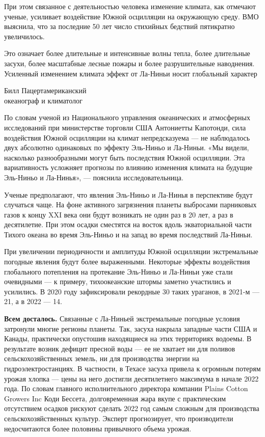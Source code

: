 При этом связанное с деятельностью человека изменение климата, как отмечают ученые, усиливает воздействие Южной осцилляции на окружающую среду. ВМО выяснила, что за последние 50 лет число стихийных бедствий пятикратно увеличилось.

\begin{fancyquotes}
    Это означает более длительные и интенсивные волны тепла, более длительные засухи, более масштабные лесные пожары и более разрушительные наводнения. Усиленный изменением климата эффект от Ла-Ниньи носит глобальный характер

    \begin{flushright}
        Билл Пацертамериканский \\
        океанограф и климатолог
    \end{flushright}
\end{fancyquotes}

По словам ученой из Национального управления океанических и атмосферных исследований при министерстве торговли США Антониетты Капотонди, сила воздействия Южной осцилляции на климат непредсказуема — не наблюдалось двух абсолютно одинаковых по эффекту Эль-Ниньо и Ла-Ниньи. «Мы видели, насколько разнообразными могут быть последствия Южной осцилляции. Эта вариативность усложняет прогнозы по влиянию изменения климата на будущие Эль-Ниньо и Ла-Нинья», — пояснила исследовательница.

Ученые предполагают, что явления Эль-Ниньо и Ла-Нинья в перспективе будут случаться чаще. На фоне активного загрязнения планеты выбросами парниковых газов к концу XXI века они будут возникать не один раз в 20 лет, а раз в десятилетие. При этом осадки сместятся на восток вдоль экваториальной части Тихого океана во время Эль-Ниньо и на запад во время последствий Ла-Ниньи.

При увеличении периодичности и амплитуды Южной осцилляции экстремальные погодные явления будут более выраженными. Некоторые эффекты воздействия глобального потепления на протекание Эль-Ниньо и Ла-Ниньи уже стали очевидными — к примеру, тихоокеанские штормы заметно участились и усилились. В 2020 году зафиксировали рекордные 30 таких ураганов, в 2021-м — 21, а в 2022 — 14.

\textbf{Всем досталось.} Связанные с Ла-Ниньей экстремальные погодные условия затронули многие регионы планеты. Так, засуха накрыла западные части США и Канады, практически опустошив находящиеся на этих территориях водоемы. В результате возник дефицит пресной воды — ее не хватает ни для поливов сельскохозяйственных земель, ни для производства энергии на гидроэлектростанциях. В частности, в Техасе засуха привела к огромным потерям урожая хлопка — цены на него достигли десятилетнего максимума в начале 2022 года. По словам главного исполнительного директора компании Plains Cotton Growers Inc Коди Бессета, долговременная жара вкупе с практическим отсутствием осадков рискуют сделать 2022 год самым сложным для производства сельскохозяйственных культур. Эксперт прогнозирует, что производители недосчитаются более половины привычного объема урожая.

